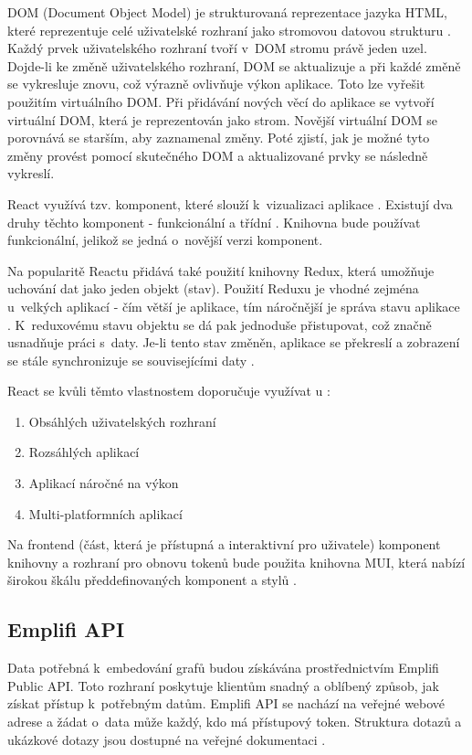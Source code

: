 \documentclass[czech, bc, kiv, he, iso690numb]{fasthesis}
\begin{document}
DOM (Document Object Model) je strukturovaná reprezentace jazyka HTML, které reprezentuje celé uživatelské rozhraní jako stromovou datovou strukturu \cite{whatIsDOM}. Každý prvek uživatelského
rozhraní tvoří v~DOM stromu právě jeden uzel. Dojde-li ke změně uživatelského rozhraní, DOM se aktualizuje 	a při každé změně se vykresluje znovu, což výrazně ovlivňuje výkon aplikace. 
Toto lze vyřešit použitím virtuálního DOM. Při přidávání nových věcí do aplikace se vytvoří virtuální DOM, která je reprezentován jako strom. Novější virtuální DOM se porovnává se starším, aby
zaznamenal změny. Poté zjistí, jak je možné tyto změny provést pomocí skutečného DOM a aktualizované prvky se následně vykreslí.

React využívá tzv. komponent, které slouží k~vizualizaci aplikace \cite{introToReact}. Existují dva druhy těchto komponent - funkcionální a třídní \cite{functionalVsClass}. Knihovna bude používat funkcionální, jelikož
se jedná o~novější verzi komponent.

Na popularitě Reactu přidává také použití knihovny Redux, která umožňuje uchování dat jako jeden objekt (stav). Použití Reduxu je vhodné zejména u~velkých aplikací - čím větší je aplikace, tím
náročnější je správa stavu aplikace \cite{introToRedux}. K~reduxovému stavu objektu se dá pak jednoduše přistupovat, což značně usnadňuje práci s~daty.
Je-li tento stav změněn, aplikace se překreslí a zobrazení se stále synchronizuje se souvisejícími daty \cite{whyUsingReact2}. 

React se kvůli těmto vlastnostem doporučuje využívat u \cite{whyUsingReact2}:
\begin{enumerate}
\item Obsáhlých uživatelských rozhraní
\item Rozsáhlých aplikací
\item Aplikací náročné na výkon
\item Multi-platformních aplikací
\end{enumerate}

Na frontend (část, která je přístupná a interaktivní pro uživatele) komponent knihovny a rozhraní pro obnovu tokenů bude použita knihovna MUI, která nabízí širokou škálu předdefinovaných komponent a stylů \cite{muiDocs}. 	

\subsection{Emplifi API}	
Data potřebná k~embedování grafů budou získávána prostřednictvím Emplifi Public API. 
Toto rozhraní poskytuje klientům snadný a oblíbený způsob, jak získat přístup k~potřebným datům. 
Emplifi API se nachází na veřejné webové adrese a žádat o~data může každý, kdo má přístupový token.
Struktura dotazů a ukázkové dotazy jsou dostupné na veřejné dokumentaci \cite{emplifiDocs}.
\end{document}

